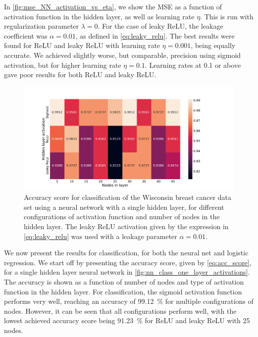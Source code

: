 \documentclass[12pt]{article}
\begin{document}
In \autoref{fig:mse_NN_activation_vs_eta}, we show the MSE as a function of activation function in the hidden layer, as well as learning rate $\eta$. This is run with regularization parameter $\lambda = 0$. For the case of leaky ReLU, the leakage coefficient was $\alpha = 0.01$, as defined in \autoref{eq:leaky_relu}. The best results were found for ReLU and leaky ReLU with learning rate $\eta = 0.001$, being equally accurate. We achieved slightly worse, but comparable, precision using sigmoid activation, but for higher learning rate $\eta = 0.1$. Learning rates at 0.1 or above gave poor results for both ReLU and leaky ReLU.

\begin{figure}
    \centering
    \includegraphics[width=\textwidth]{images/accuracy_activations_and_nodes_fixed_eta.pdf}
    \caption{Accuracy score for classification of the Wisconsin breast cancer data set using a neural network with a single hidden layer, for different configurations of activation function and number of nodes in the hidden layer. The leaky ReLU activation given by the expression in \autoref{eq:leaky_relu} was used with a leakage parameter $\alpha=0.01$.}
    \label{fig:nn_class_one_layer_activations}
\end{figure}

We now present the results for classification, for both the neural net and logistic regression. We start off by presenting the accuracy score, given by \autoref{eq:acc_score}, for a single hidden layer neural network in \autoref{fig:nn_class_one_layer_activations}. The accuracy is shown as a function of number of nodes and type of activation function in the hidden layer. For classification, the sigmoid activation function performs very well, reaching an accuracy of \SI{99.12}{\%} for multiple configurations of nodes. However, it can be seen that all configurations perform well, with the lowest achieved accuracy score being \SI{91.23}{\%} for ReLU and leaky ReLU with 25 nodes. 
\end{document}
